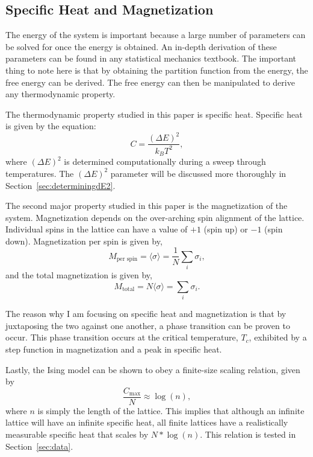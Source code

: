 \documentclass[12pt]{article}
\begin{document}
\subsection{Specific Heat and Magnetization}
\label{sec:solvingforparameters}
The energy of the system is important because a large number of parameters can be solved for once the energy is obtained. An in-depth derivation of these parameters can be found in any statistical mechanics textbook. The important thing to note here is that by obtaining the partition function from the energy, the free energy can be derived. The free energy can then be manipulated to derive any thermodynamic property.

The thermodynamic property studied in this paper is specific heat. Specific heat is given by the equation:
\begin{equation}
  \label{eq:specificheat}
  C = \frac{\left(\Delta E\right)^2}{k_B T^2},
\end{equation}
where $\left(\Delta E\right)^2$ is determined computationally during a sweep through temperatures. The $\left(\Delta E\right)^2$ parameter will be discussed more thoroughly in Section~\ref{sec:determiningdE2}.

The second major property studied in this paper is the magnetization of the system. Magnetization depends on the over-arching spin alignment of the lattice. Individual spins in the lattice can have a value of $+1$ (spin up) or $-1$ (spin down). Magnetization per spin is given by,
\begin{equation}
  \label{eq:magnetizationperspin}
  M_{\text{per spin}} = \langle \sigma \rangle = \frac{1}{N}\sum_i \sigma_i,
\end{equation}
and the total magnetization is given by,
\begin{equation}
  \label{eq:magnetizationtotal}
  M_{\text{total}} = N \langle \sigma \rangle = \sum_i \sigma_i.
\end{equation}

The reason why I am focusing on specific heat and magnetization is that by juxtaposing the two against one another, a phase transition can be proven to occur. This phase transition occurs at the critical temperature, $T_c$, exhibited by a step function in magnetization and a peak in specific heat.

Lastly, the Ising model can be shown to obey a finite-size scaling relation, given by
\begin{equation}
  \label{eq:finitescaling}
  \frac{C_{\text{max}}}{N} \approx \log (n),
\end{equation}
where $n$ is simply the length of the lattice. This implies that although an infinite lattice will have an infinite specific heat, all finite lattices have a realistically measurable specific heat that scales by $N*\log(n)$. This relation is tested in Section~\ref{sec:data}.
\end{document}
